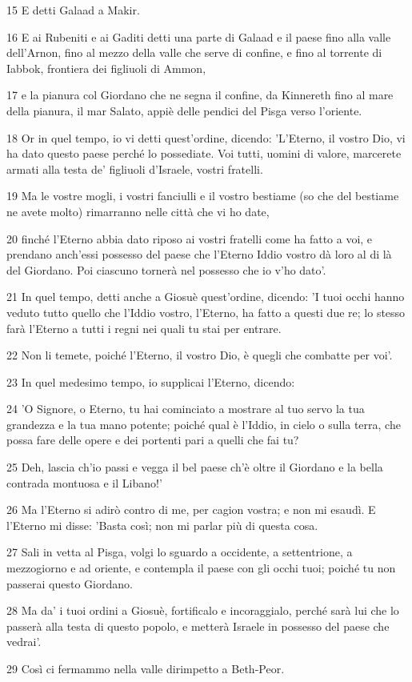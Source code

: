 \par 15 E detti Galaad a Makir.
\par 16 E ai Rubeniti e ai Gaditi detti una parte di Galaad e il paese fino alla valle dell'Arnon, fino al mezzo della valle che serve di confine, e fino al torrente di Iabbok, frontiera dei figliuoli di Ammon,
\par 17 e la pianura col Giordano che ne segna il confine, da Kinnereth fino al mare della pianura, il mar Salato, appiè delle pendici del Pisga verso l'oriente.
\par 18 Or in quel tempo, io vi detti quest'ordine, dicendo: 'L'Eterno, il vostro Dio, vi ha dato questo paese perché lo possediate. Voi tutti, uomini di valore, marcerete armati alla testa de' figliuoli d'Israele, vostri fratelli.
\par 19 Ma le vostre mogli, i vostri fanciulli e il vostro bestiame (so che del bestiame ne avete molto) rimarranno nelle città che vi ho date,
\par 20 finché l'Eterno abbia dato riposo ai vostri fratelli come ha fatto a voi, e prendano anch'essi possesso del paese che l'Eterno Iddio vostro dà loro al di là del Giordano. Poi ciascuno tornerà nel possesso che io v'ho dato'.
\par 21 In quel tempo, detti anche a Giosuè quest'ordine, dicendo: 'I tuoi occhi hanno veduto tutto quello che l'Iddio vostro, l'Eterno, ha fatto a questi due re; lo stesso farà l'Eterno a tutti i regni nei quali tu stai per entrare.
\par 22 Non li temete, poiché l'Eterno, il vostro Dio, è quegli che combatte per voi'.
\par 23 In quel medesimo tempo, io supplicai l'Eterno, dicendo:
\par 24 'O Signore, o Eterno, tu hai cominciato a mostrare al tuo servo la tua grandezza e la tua mano potente; poiché qual è l'Iddio, in cielo o sulla terra, che possa fare delle opere e dei portenti pari a quelli che fai tu?
\par 25 Deh, lascia ch'io passi e vegga il bel paese ch'è oltre il Giordano e la bella contrada montuosa e il Libano!'
\par 26 Ma l'Eterno si adirò contro di me, per cagion vostra; e non mi esaudì. E l'Eterno mi disse: 'Basta così; non mi parlar più di questa cosa.
\par 27 Sali in vetta al Pisga, volgi lo sguardo a occidente, a settentrione, a mezzogiorno e ad oriente, e contempla il paese con gli occhi tuoi; poiché tu non passerai questo Giordano.
\par 28 Ma da' i tuoi ordini a Giosuè, fortificalo e incoraggialo, perché sarà lui che lo passerà alla testa di questo popolo, e metterà Israele in possesso del paese che vedrai'.
\par 29 Così ci fermammo nella valle dirimpetto a Beth-Peor.

